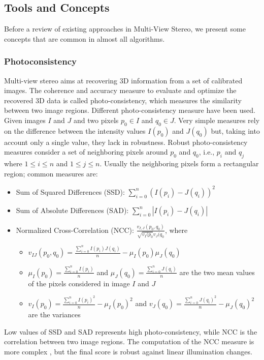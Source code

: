 \subsection{Tools and Concepts}
Before a review of existing approaches  in Multi-View Stereo, we present some concepts that are common in almost all algorithms.
\subsubsection{Photoconsistency}
Multi-view stereo aims at recovering 3D information from a set of calibrated images. The coherence and accuracy measure to evaluate and optimize the recovered 3D data is called photo-consistency, which measures the similarity between two image regions.
Different photo-consistency measure have been used. 
Given images $I$ and $J$ and two pixels $p_0\in I$ and $q_0\in J$. Very simple measures rely on the difference between the intensity values  $I(p_0)$ and $J(q_0)$ but, taking into account only a single value, they lack in robustness. 
Robust photo-consistency measures consider a set of neighboring  pixels around $p_0$ and $q_0$, i.e., $p_i$ and $q_j$ where $1\leq i \leq n$ and $1\leq j \leq n$. Usually the neighboring pixels form a rectangular region; common measures are:
\begin{itemize}
  \item Sum of Squared Differences (SSD): $\sum_{i=0}^{n}(I(p_i) - J(q_i))^2$
  \item Sum of Absolute Differences (SAD): $\sum_{i=0}^{n}|I(p_i) - J(q_i)|$
  \item Normalized Cross-Correlation (NCC): $\frac{v_{I,J}(p_0,q_0)}{\sqrt{v_{I}(p_0} v_{J}(q_0}$,
  where 
  \begin{itemize}
    \item $v_{IJ}(p_0,q_0) = \frac{\sum_{i=0}^{n}I(p_i)J(q_i)}{n} - \mu_I(p_0) \mu_{J}(q_0)$
    \item $\mu_{I}(p_0) = \frac{\sum_{i=0}^{n}I(p_i)}{n}$ and $\mu_{J}(q_0) = \frac{\sum_{i=0}^{n}J(q_i)}{n}$ are the two mean values of the pixels considered in image $I$ and $J$
    \item $v_{I}(p_0) = \frac{\sum_{i=0}^{n}I(p_i)^2}{n} - \mu_I(p_0)^2$ and $v_{J}(q_0) = \frac{\sum_{i=0}^{n}J(q_i)^2}{n} - \mu_{J}(q_0)^2$ are the variances
  \end{itemize}
\end{itemize}
Low values of SSD and SAD represents high photo-consistency, while NCC is the correlation between two image regions. 
The computation of the NCC measure is more complex , but the final score is robust against linear illumination changes.


